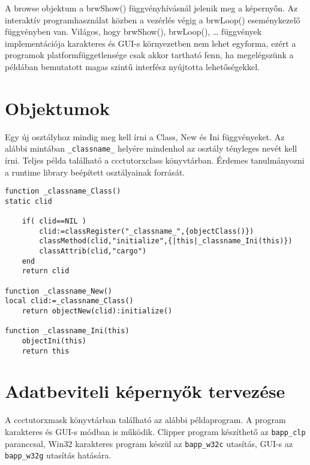 A browse objektum a brwShow() függvényhívásnál jelenik meg a képernyőn.
Az interaktív programhasználat közben a vezérlés végig a brwLoop()
eseménykezelő függvényben van. Világos, hogy brwShow(), brwLoop(), \ldots
függvények implementációja karakteres és GUI-s környezetben nem lehet egyforma,
ezért a programok platformfüggetlensége csak akkor tartható fenn,
ha megelégszünk a példában bemutatott magas szintű interfész nyújtotta
lehetőségekkel.



\section{Objektumok}

Egy új osztályhoz mindig meg kell írni a Class, New és Ini függvényeket. 
Az alábbi mintában \verb'_classname_' helyére mindenhol az osztály tényleges 
nevét kell írni. Teljes példa található a ccctutor\bslash xclass könyvtárban.
Érdemes tanulmányozni a runtime library beépített osztályainak forrását.

\begin{verbatim}
function _classname_Class() 
static clid

    if( clid==NIL )
        clid:=classRegister("_classname_",{objectClass()})
        classMethod(clid,"initialize",{|this|_classname_Ini(this)})
        classAttrib(clid,"cargo")
    end
    return clid

function _classname_New() 
local clid:=_classname_Class()
    return objectNew(clid):initialize()

function _classname_Ini(this) 
    objectIni(this)
    return this

\end{verbatim}


\section{Adatbeviteli képernyők tervezése}

A ccctutor\bslash xmask könyvtárban található az alábbi példaprogram.
A program karakteres és GUI-s módban is működik.
Clipper program készíthető az \verb'bapp_clp' paranccsal, 
Win32 karakteres program készül az \verb'bapp_w32c' utasítás, 
GUI-s az \verb'bapp_w32g' utasítás hatására.


